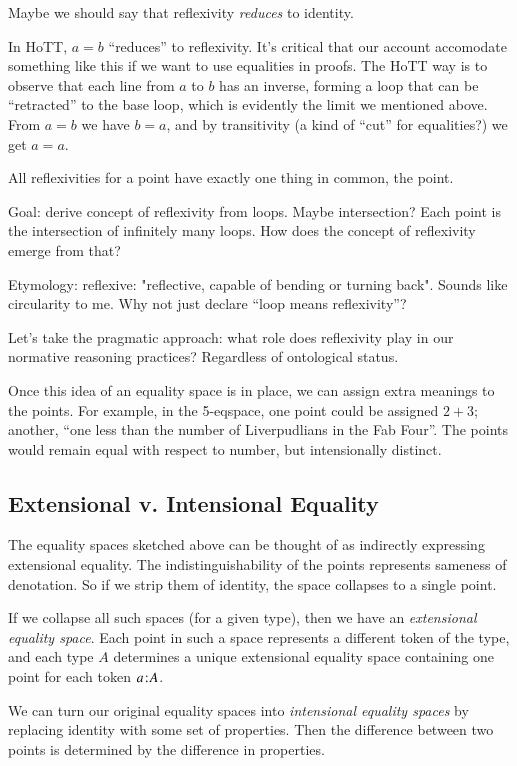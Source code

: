 Maybe we should say that reflexivity \textit{reduces} to identity.

In HoTT, \(a=b\) ``reduces'' to reflexivity. It's critical that our
account accomodate something like this if we want to use equalities in
proofs. The HoTT way is to observe that each line from \(a\) to \(b\)
has an inverse, forming a loop that can be ``retracted'' to the base
loop, which is evidently the limit we mentioned above. From \(a=b\) we
have \(b=a\), and by transitivity (a kind of ``cut'' for equalities?)
we get \(a=a\).

All reflexivities for a point have exactly one thing in common, the
point.

Goal: derive concept of reflexivity from loops. Maybe intersection?
Each point is the intersection of infinitely many loops. How does the concept of reflexivity emerge from that?

Etymology: reflexive: "reflective, capable of bending or turning
back". Sounds like circularity to me. Why not just declare ``loop
means reflexivity''?

Let's take the pragmatic approach: what role does reflexivity play in
our normative reasoning practices? Regardless of ontological status.

Once this idea of an equality space is in place, we can assign extra
meanings to the points. For example, in the 5-eqspace, one point could
be assigned \(2+3\); another, ``one less than the number of
Liverpudlians in the Fab Four''. The points would remain equal with
respect to number, but intensionally distinct.

\subsection{Extensional v. Intensional Equality}

The equality spaces sketched above can be thought of as indirectly
expressing extensional equality. The indistinguishability of the
points represents sameness of denotation. So if we strip them of
identity, the space collapses to a single point.

If we collapse all such spaces (for a given type), then we have an
\textit{extensional equality space}. Each point in such a space
represents a different token of the type, and each type \(A\)
determines a unique extensional equality space containing one point
for each token \(a\hspace{1pt}\mathpunct{:}\hspace{-1pt}A\).

We can turn our original equality spaces into \textit{intensional
  equality spaces} by replacing identity with some set of properties.
Then the difference between two points is determined by the difference
in properties.

